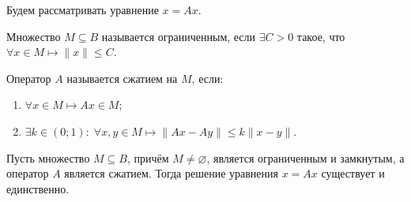 Будем рассматривать уравнение $x = Ax$.

\begin{definition}
    Множество $M \subseteq B$ называется ограниченным, если $\exists C > 0$ такое, что $\forall x \in M \longmapsto \|x\| \leqslant C$.
\end{definition}

\begin{definition}
    Оператор $A$ называется сжатием на $M$, если:
    \begin{enumerate}
        \item $\forall x \in M \longmapsto Ax \in M$;
        
        \item $\exists k \in (0; 1): \; \forall x, y \in M \longmapsto \|Ax - Ay\| \leqslant k\|x -y\|$.
    \end{enumerate}
\end{definition}

\begin{theorem}
    
    Пусть множество $M \subseteq B$, причём $M \neq \varnothing$, является ограниченным и замкнутым, а оператор $A$ является сжатием. Тогда решение уравнения $x = Ax$ существует и единственно.
\end{theorem}

